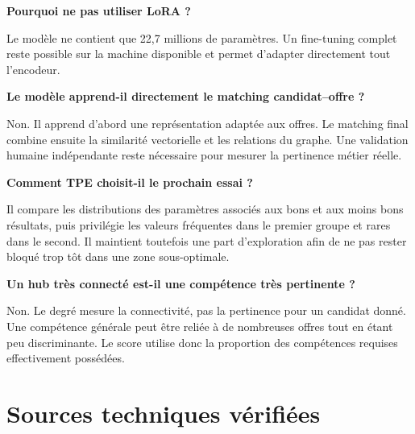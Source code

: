 \documentclass[12pt,a4paper]{article}
\begin{document}
\textbf{Pourquoi ne pas utiliser LoRA ?}\par
Le modèle ne contient que 22,7 millions de paramètres. Un fine-tuning complet reste possible sur
la machine disponible et permet d'adapter directement tout l'encodeur.

\textbf{Le modèle apprend-il directement le matching candidat--offre ?}\par
Non. Il apprend d'abord une représentation adaptée aux offres. Le matching final combine ensuite
la similarité vectorielle et les relations du graphe. Une validation humaine indépendante reste
nécessaire pour mesurer la pertinence métier réelle.

\textbf{Comment TPE choisit-il le prochain essai ?}\par
Il compare les distributions des paramètres associés aux bons et aux moins bons résultats, puis
privilégie les valeurs fréquentes dans le premier groupe et rares dans le second. Il maintient
toutefois une part d'exploration afin de ne pas rester bloqué trop tôt dans une zone sous-optimale.

\textbf{Un hub très connecté est-il une compétence très pertinente ?}\par
Non. Le degré mesure la connectivité, pas la pertinence pour un candidat donné. Une compétence
générale peut être reliée à de nombreuses offres tout en étant peu discriminante. Le score utilise
donc la proportion des compétences requises effectivement possédées.

\section{Sources techniques vérifiées}
\end{document}
